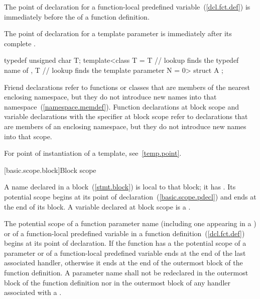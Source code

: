 \pnum
The point of declaration for a function-local predefined
variable~(\ref{dcl.fct.def}) is immediately before the
 of a function definition.

\pnum
The point of declaration for a template parameter is immediately after its complete
. \enterexample

\begin{codeblock}
typedef unsigned char T;
template<class T
  = T     // lookup finds the typedef name of 
  , T     // lookup finds the template parameter
    N = 0> struct A { };
\end{codeblock}
\exitexample

\pnum
\enternote Friend declarations refer to functions or classes that are
members of the nearest enclosing namespace, but they do not introduce
new names into that namespace~(\ref{namespace.memdef}). Function
declarations at block scope and variable declarations with the
 specifier at block scope refer to declarations that are
members of an enclosing namespace, but they do not introduce new names
into that scope.
\exitnote

\pnum
\enternote For point of instantiation of a template,
see~\ref{temp.point}.\exitnote%

[basic.scope.block]{Block scope}

\pnum
{}%
%
A name declared in a block~(\ref{stmt.block}) is local to that block; it has
.
Its potential scope begins at its point of
declaration~(\ref{basic.scope.pdecl}) and ends at the end of its block.
A variable declared at block scope is a .

\pnum
{}%
The potential scope of a function parameter name
(including one appearing in a 
)
or of a function-local predefined variable
in a function
definition~(\ref{dcl.fct.def}) begins at its point of declaration. If
the function has a  the potential scope of
a parameter
or of a function-local predefined variable
ends at the end of the last associated handler, otherwise it ends
at the end of the outermost block of the function definition. A
parameter name shall not be redeclared in the outermost block of the
function definition nor in the outermost block of any handler associated
with a .

